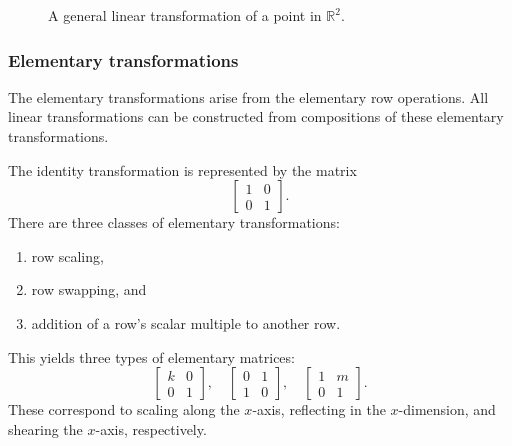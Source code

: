 \begin{figure}
    \caption{A general linear transformation of a point in \(\mathbb{R}^{2}\).}
    \label{fig:affine-R2lineartransformation}
\end{figure}

\subsubsection{Elementary transformations}

The elementary transformations arise from the elementary row 
operations. All linear transformations can be constructed from
compositions of these elementary transformations.

The identity transformation is represented by the matrix
\[
    \begin{bmatrix}
        1 & 0 \\
        0 & 1
    \end{bmatrix}.
\]
There are three classes of elementary transformations:
\begin{enumerate}
    \item row scaling,
    \item row swapping, and
    \item addition of a row's scalar multiple to another row.
\end{enumerate}
This yields three types of elementary matrices:
\[
    \begin{bmatrix}
        k & 0 \\
        0 & 1
    \end{bmatrix},\quad
    \begin{bmatrix}
        0 & 1 \\
        1 & 0
    \end{bmatrix},\quad
    \begin{bmatrix}
        1 & m \\
        0 & 1
    \end{bmatrix}.
\]
These correspond to scaling along the \(x\)-axis, reflecting in the 
\(x\)-dimension, and shearing the \(x\)-axis, respectively.

